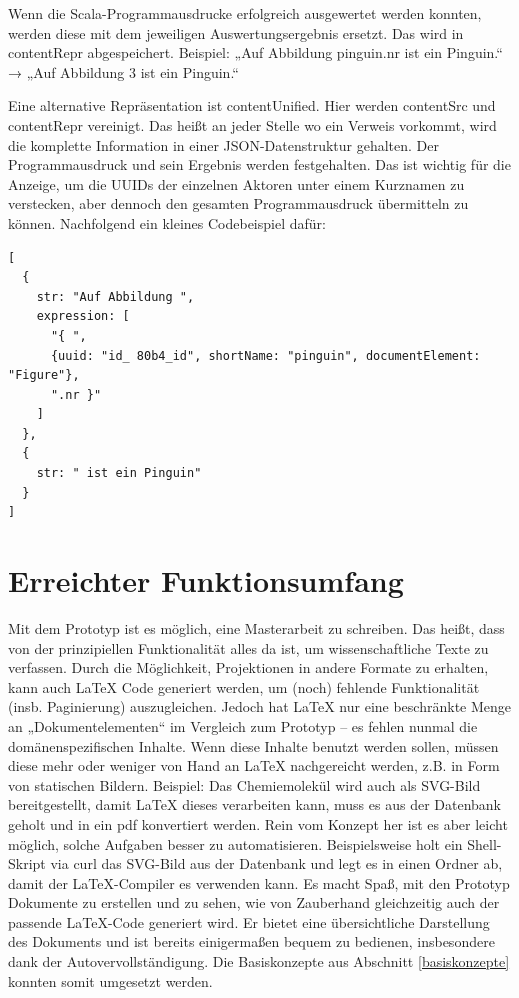  
Wenn die Scala-Programmausdrucke erfolgreich ausgewertet werden konnten, werden diese mit dem jeweiligen Auswertungsergebnis ersetzt. Das wird in contentRepr abgespeichert. Beispiel: „Auf Abbildung { pinguin.nr } ist ein Pinguin.“ → „Auf Abbildung 3 ist ein Pinguin.“

 
Eine alternative Repräsentation ist contentUnified. Hier werden contentSrc und contentRepr vereinigt. Das heißt an jeder Stelle wo ein Verweis vorkommt, wird die komplette Information in einer JSON-Datenstruktur gehalten. Der Programmausdruck und sein Ergebnis werden festgehalten. Das ist wichtig für die Anzeige, um die UUIDs der einzelnen Aktoren unter einem Kurznamen zu verstecken, aber dennoch den gesamten Programmausdruck übermitteln zu können. Nachfolgend ein kleines Codebeispiel dafür:

 
\begin{verbatim}
[
  {
    str: "Auf Abbildung ",
    expression: [
      "{ ",
      {uuid: "id_ 80b4_id", shortName: "pinguin", documentElement: "Figure"},
      ".nr }"
    ]
  },
  {
    str: " ist ein Pinguin"
  }
]
\end{verbatim}
 
\section{Erreichter Funktionsumfang}\label{}
 
Mit dem Prototyp ist es möglich, eine Masterarbeit zu schreiben. Das heißt, dass von der prinzipiellen Funktionalität alles da ist, um wissenschaftliche Texte zu verfassen. Durch die Möglichkeit, Projektionen in andere Formate zu erhalten, kann auch LaTeX Code generiert werden, um (noch) fehlende Funktionalität (insb. Paginierung) auszugleichen. Jedoch hat LaTeX nur eine beschränkte Menge an „Dokumentelementen“ im Vergleich zum Prototyp -- es fehlen nunmal die domänenspezifischen Inhalte. Wenn diese Inhalte benutzt werden sollen, müssen diese mehr oder weniger von Hand an LaTeX nachgereicht werden, z.B. in Form von statischen Bildern. Beispiel: Das Chemiemolekül wird auch als SVG-Bild bereitgestellt, damit LaTeX dieses verarbeiten kann, muss es aus der Datenbank geholt und in ein pdf konvertiert werden. Rein vom Konzept her ist es aber leicht möglich, solche Aufgaben besser zu automatisieren. Beispielsweise holt ein Shell-Skript via curl das SVG-Bild aus der Datenbank und legt es in einen Ordner ab, damit der LaTeX-Compiler es verwenden kann. Es macht Spaß, mit den Prototyp Dokumente zu erstellen und zu sehen, wie von Zauberhand gleichzeitig auch der passende LaTeX-Code generiert wird. Er bietet eine übersichtliche Darstellung des Dokuments und ist bereits einigermaßen bequem zu bedienen, insbesondere dank der Autovervollständigung. Die Basiskonzepte aus Abschnitt \ref{basiskonzepte} konnten somit umgesetzt werden.

